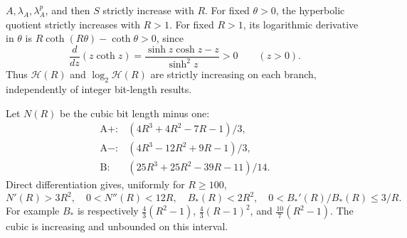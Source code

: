 $A,\lambda_A,\lambda_A^p$, and then $S$ strictly increase with $R$.
For fixed $\theta>0$, the hyperbolic quotient strictly increases
with $R>1$. For fixed $R>1$, its logarithmic derivative in $\theta$
is $R\coth(R\theta)-\coth\theta>0$, since
\[
 \frac{d}{dz}(z\coth z)
 =\frac{\sinh z\cosh z-z}{\sinh^2z}>0\qquad(z>0).
\]
Thus $\mathcal H(R)$ and $\log_2\mathcal H(R)$ are strictly
increasing on each branch, independently of integer bit-length results.

Let $N(R)$ be the cubic bit length minus one:
\begin{equation}\label{eq:Ncubics}
\begin{array}{ll}
\mathrm A+:&(4R^3+4R^2-7R-1)/3,\\
\mathrm A-:&(4R^3-12R^2+9R-1)/3,\\
\mathrm B:&(25R^3+25R^2-39R-11)/14.
\end{array}
\end{equation}
Direct differentiation gives, uniformly for $R\ge100$,
\begin{equation}\label{eq:derivativebudget}
 N'(R)>3R^2,\quad 0<N''(R)<12R,\quad
 B_*(R)<2R^2,\quad 0<B_*'(R)/B_*(R)\le3/R.
\end{equation}
For example $B_*$ is respectively
$\frac43(R^2-1)$, $\frac43(R-1)^2$, and $\frac{10}{7}(R^2-1)$.
The cubic is increasing and unbounded on this interval.


